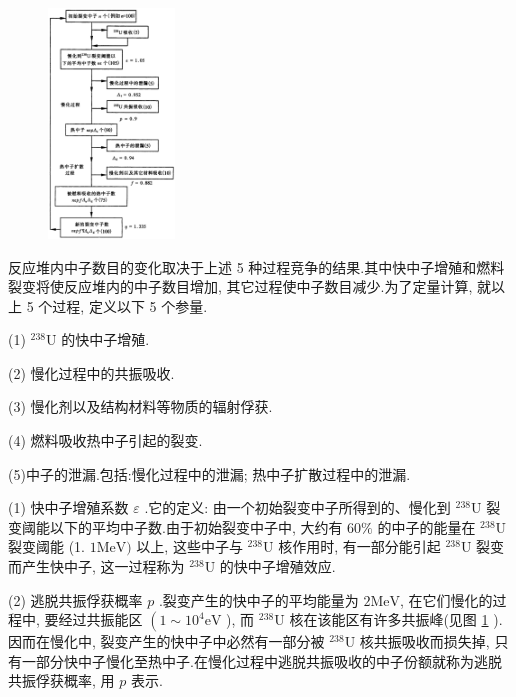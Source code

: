\documentclass{Sichuan Normal University}
\begin{document}
\begin{figure}
    \centering
    \includegraphics[width=0.3\textwidth]{./figure/热中子反应堆内的中子平衡.png} %
    \vspace{3mm}
    \label{fig:热中子反应堆内的中子平衡}
  \end{figure}
反应堆内中子数目的变化取决于上述 5 种过程竞争的结果.其中快中子增殖和燃料裂变将使反应堆内的中子数目增加, 其它过程使中子数目减少.为了定量计算, 就以上 5 个过程, 定义以下 5 个参量.

(1) ${ }^{238} \mathrm{U}$ 的快中子增殖.

(2) 慢化过程中的共振吸收.

(3) 慢化剂以及结构材料等物质的辐射俘获.

(4) 燃料吸收热中子引起的裂变.

(5)中子的泄漏.包括:慢化过程中的泄漏; 热中子扩散过程中的泄漏.

(1) 快中子增殖系数 $\varepsilon$ .它的定义: 由一个初始裂变中子所得到的、慢化到 ${ }^{238} \mathrm{U}$ 裂变阈能以下的平均中子数.由于初始裂变中子中, 大约有 $60 \%$ 的中子的能量在 ${ }^{238} \mathrm{U}$ 裂变阈能 (1. $1 \mathrm{MeV})$ 以上, 这些中子与 ${ }^{238} \mathrm{U}$ 核作用时, 有一部分能引起 ${ }^{238} \mathrm{U}$ 裂变而产生快中子, 这一过程称为 ${ }^{238} \mathrm{U}$ 的快中子增殖效应.

(2) 逃脱共振俘获概率 $p$ .裂变产生的快中子的平均能量为 $2 \mathrm{MeV}$, 在它们慢化的过程中, 要经过共振能区 $\left(1 \sim 10^4 \mathrm{eV}\right.$ ), 而 ${ }^{238} \mathrm{U}$ 核在该能区有许多共振峰(见图 \ref{fig:热中子反应堆内的中子平衡} ).因而在慢化中, 裂变产生的快中子中必然有一部分被 ${ }^{238} \mathrm{U}$ 核共振吸收而损失掉, 只有一部分快中子慢化至热中子.在慢化过程中逃脱共振吸收的中子份额就称为逃脱共振俘获概率, 用 $p$ 表示.
\end{document}
